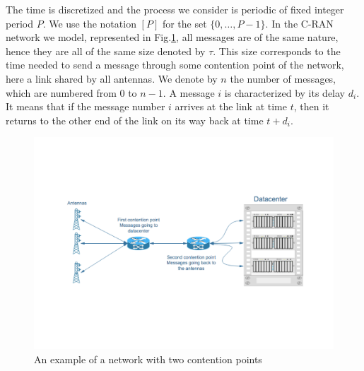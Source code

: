 \documentclass[10pt, conference, letterpaper]{IEEEtran}
\begin{document}
The time is discretized and the process we consider is periodic of fixed integer period $P$. We use the notation $[P]$ for the set $\{0,\dots,P-1\}$. In the C-RAN network we model, represented in Fig.\ref{fig:model}, all messages are of the same nature, hence they are all of the same size denoted by $\tau$. This size corresponds to the time needed to send a message through some contention point of the network, here a link shared by all antennas. We denote by $n$ the number of messages, which are numbered from $0$ to $n-1$. A message $i$ is characterized by its delay $d_i$. It means that if the message number $i$ arrives at the link at time $t$, then it returns to the other end of the link on its way back at time $t + d_i$. 
\begin{center}
\begin{figure}
\centering
\includegraphics[scale=0.35]{network.pdf}
\centering
{}
\caption{An example of a network with two contention points}
\label{fig:model}
\end{figure}
\end{center}
\end{document}
